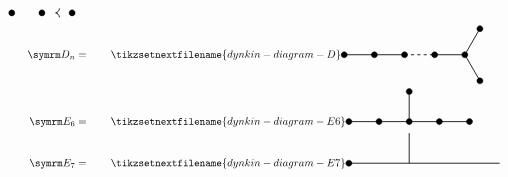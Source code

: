\documentclass[fleqn, a4paper, openany]{memoir}
\begin{document}
\begin{align}
\begin{tikzpicture}[dynkin node/.style = {fill}, dynkin wire/.style = {thick}]
            \draw [dynkin node] (3, 0) circle [radius=0.1cm];
            \draw [dynkin node] (4, 0) circle [radius=0.1cm];
            \draw [dynkin node] (5, 0) circle [radius=0.1cm];
            \draw [-{>[width=0.3cm, length=0.15cm]}, dynkin wire] (4.45, 0) -- ++ (-0.001, 0);
        \end{tikzpicture}
        \\
        \D[n] &= \qquad
        \tikzsetnextfilename{dynkin-diagram-D}
        \begin{tikzpicture}[dynkin node/.style = {fill}, dynkin wire/.style = {thick}, baseline=-0.1cm]
            \draw [dynkin node] (0, 0) circle [radius=0.1cm];
            \draw [dynkin wire] (0, 0) -- ++ (2, 0);
            \draw [dynkin node] (1, 0) circle [radius=0.1cm];
            \draw [dynkin node] (2, 0) circle [radius=0.1cm];
            \draw [dynkin wire, dashed] (2, 0) -- ++ (1, 0);
            \draw [dynkin wire] (3, 0) -- (4, 0);
            \draw [dynkin wire] (4, 0) -- ++ (60:1) coordinate (A);
            \draw [dynkin wire] (4, 0) -- ++ (-60:1) coordinate (B);
            \draw [dynkin node] (3, 0) circle [radius=0.1cm];
            \draw [dynkin node] (4, 0) circle [radius=0.1cm];
            \draw [dynkin node] (A) circle [radius=0.1cm];
            \draw [dynkin node] (B) circle [radius=0.1cm];
        \end{tikzpicture}
        \\
        \E[6] &= \qquad
        \tikzsetnextfilename{dynkin-diagram-E6}
        \begin{tikzpicture}[dynkin node/.style = {fill}, dynkin wire/.style = {thick}, baseline=-0.1cm]
            \draw [dynkin wire] (0, 0) -- ++ (4, 0);
            \draw [dynkin wire] (2, 0) -- ++ (0, 1);
            \draw [dynkin node] (0, 0) circle [radius=0.1cm];
            \draw [dynkin node] (1, 0) circle [radius=0.1cm];
            \draw [dynkin node] (2, 0) circle [radius=0.1cm];
            \draw [dynkin node] (3, 0) circle [radius=0.1cm];
            \draw [dynkin node] (4, 0) circle [radius=0.1cm];
            \draw [dynkin node] (2, 1) circle [radius=0.1cm];
        \end{tikzpicture}
        \\
        \E[7] &= \qquad
        \tikzsetnextfilename{dynkin-diagram-E7}
        \begin{tikzpicture}[dynkin node/.style = {fill}, dynkin wire/.style = {thick}, baseline=-0.1cm]
            \draw [dynkin wire] (0, 0) -- ++ (5, 0);
            \draw [dynkin wire] (2, 0) -- ++ (0, 1);
            \draw [dynkin node] (0, 0) circle [radius=0.1cm];

\end{tikzpicture}
\end{align}
\end{document}

